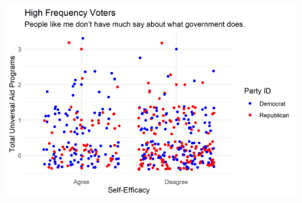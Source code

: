 \documentclass[12pt]{paper}
\begin{document}
\begin{figure}[H]
	\includegraphics[scale=0.7]{Figs/scatter_uni_efficacy_high.png} \centering
	\caption{}
	\label{}
\end{figure}
\end{document}
